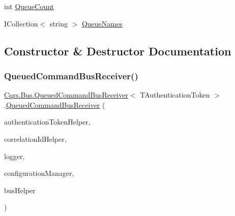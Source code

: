 \begin{DoxyCompactItemize}
\item 
int \hyperlink{classCqrs_1_1Bus_1_1QueuedCommandBusReceiver_aefae09fd32d799ac59d35eb706f76654}{Queue\+Count}
\item 
I\+Collection$<$ string $>$ \hyperlink{classCqrs_1_1Bus_1_1QueuedCommandBusReceiver_a959facef20063d615b427eafa4290e0f}{Queue\+Names}
\end{DoxyCompactItemize}


\subsection{Constructor \& Destructor Documentation}
\mbox{\label{classCqrs_1_1Bus_1_1QueuedCommandBusReceiver_aa5158357f8e2007f06b640d4a4129781}} 
\subsubsection{\texorpdfstring{Queued\+Command\+Bus\+Receiver()}{QueuedCommandBusReceiver()}}
{\footnotesize\ttfamily \hyperlink{classCqrs_1_1Bus_1_1QueuedCommandBusReceiver}{Cqrs.\+Bus.\+Queued\+Command\+Bus\+Receiver}$<$ T\+Authentication\+Token $>$.\hyperlink{classCqrs_1_1Bus_1_1QueuedCommandBusReceiver}{Queued\+Command\+Bus\+Receiver} (\begin{DoxyParamCaption}\item[{\hyperlink{interfaceCqrs_1_1Authentication_1_1IAuthenticationTokenHelper}{I\+Authentication\+Token\+Helper}$<$ T\+Authentication\+Token $>$}]{authentication\+Token\+Helper,  }\item[{I\+Correlation\+Id\+Helper}]{correlation\+Id\+Helper,  }\item[{I\+Logger}]{logger,  }\item[{\hyperlink{interfaceCqrs_1_1Configuration_1_1IConfigurationManager}{I\+Configuration\+Manager}}]{configuration\+Manager,  }\item[{\hyperlink{interfaceCqrs_1_1Bus_1_1IBusHelper}{I\+Bus\+Helper}}]{bus\+Helper }\end{DoxyParamCaption})\hspace{0.3cm}{\ttfamily [protected]}}



